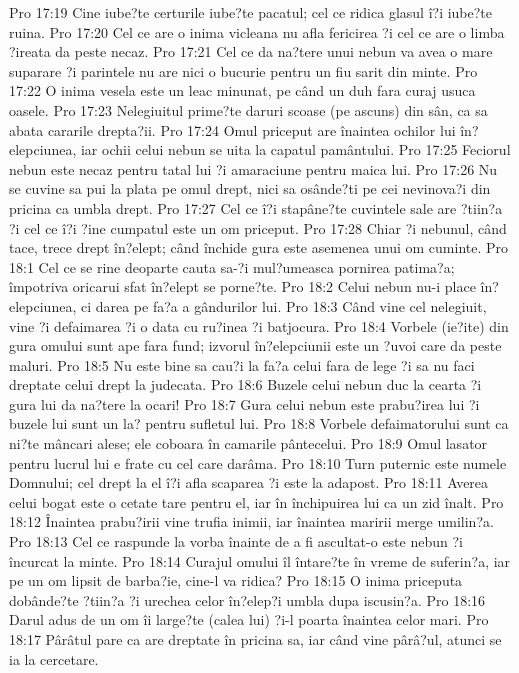 Pro 17:19  Cine iube?te certurile iube?te pacatul; cel ce ridica glasul î?i iube?te ruina.
Pro 17:20  Cel ce are o inima vicleana nu afla fericirea ?i cel ce are o limba ?ireata da peste necaz.
Pro 17:21  Cel ce da na?tere unui nebun va avea o mare suparare ?i parintele nu are nici o bucurie pentru un fiu sarit din minte.
Pro 17:22  O inima vesela este un leac minunat, pe când un duh fara curaj usuca oasele.
Pro 17:23  Nelegiuitul prime?te daruri scoase (pe ascuns) din sân, ca sa abata cararile drepta?ii.
Pro 17:24  Omul priceput are înaintea ochilor lui în?elepciunea, iar ochii celui nebun se uita la capatul pamântului.
Pro 17:25  Feciorul nebun este necaz pentru tatal lui ?i amaraciune pentru maica lui.
Pro 17:26  Nu se cuvine sa pui la plata pe omul drept, nici sa osânde?ti pe cei nevinova?i din pricina ca umbla drept.
Pro 17:27  Cel ce î?i stapâne?te cuvintele sale are ?tiin?a ?i cel ce î?i ?ine cumpatul este un om priceput.
Pro 17:28  Chiar ?i nebunul, când tace, trece drept în?elept; când închide gura este asemenea unui om cuminte.
Pro 18:1  Cel ce se rine deoparte cauta sa-?i mul?umeasca pornirea patima?a; împotriva oricarui sfat în?elept se porne?te.
Pro 18:2  Celui nebun nu-i place în?elepciunea, ci darea pe fa?a a gândurilor lui.
Pro 18:3  Când vine cel nelegiuit, vine ?i defaimarea ?i o data cu ru?inea ?i batjocura.
Pro 18:4  Vorbele (ie?ite) din gura omului sunt ape fara fund; izvorul în?elepciunii este un ?uvoi care da peste maluri.
Pro 18:5  Nu este bine sa cau?i la fa?a celui fara de lege ?i sa nu faci dreptate celui drept la judecata.
Pro 18:6  Buzele celui nebun duc la cearta ?i gura lui da na?tere la ocari!
Pro 18:7  Gura celui nebun este prabu?irea lui ?i buzele lui sunt un la? pentru sufletul lui.
Pro 18:8  Vorbele defaimatorului sunt ca ni?te mâncari alese; ele coboara în camarile pântecelui.
Pro 18:9  Omul lasator pentru lucrul lui e frate cu cel care darâma.
Pro 18:10  Turn puternic este numele Domnului; cel drept la el î?i afla scaparea ?i este la adapost.
Pro 18:11  Averea celui bogat este o cetate tare pentru el, iar în închipuirea lui ca un zid înalt.
Pro 18:12  Înaintea prabu?irii vine trufia inimii, iar înaintea maririi merge umilin?a.
Pro 18:13  Cel ce raspunde la vorba înainte de a fi ascultat-o este nebun ?i încurcat la minte.
Pro 18:14  Curajul omului îl întare?te în vreme de suferin?a, iar pe un om lipsit de barba?ie, cine-l va ridica?
Pro 18:15  O inima priceputa dobânde?te ?tiin?a ?i urechea celor în?elep?i umbla dupa iscusin?a.
Pro 18:16  Darul adus de un om îi large?te (calea lui) ?i-l poarta înaintea celor mari.
Pro 18:17  Pârâtul pare ca are dreptate în pricina sa, iar când vine pârâ?ul, atunci se ia la cercetare.
